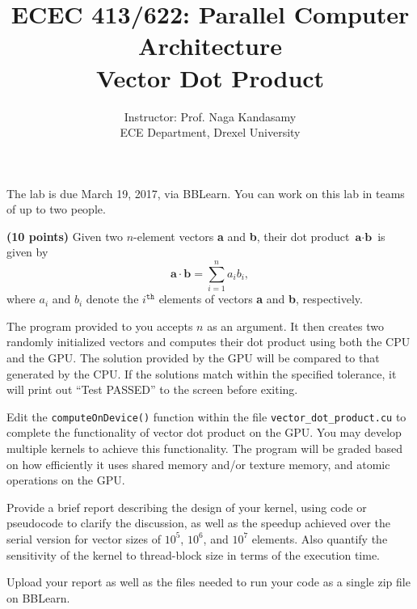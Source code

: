 \documentclass[12pt]{article}
\begin{document}
\title{ECEC 413/622: Parallel Computer Architecture \\
Vector Dot Product}
\author{Instructor: Prof. Naga Kandasamy \\ 
    ECE Department, Drexel University}
\maketitle %
\date{}

\noindent The lab is due March 19, 2017, via BBLearn. You can work on this lab in teams of up to two people.
\vspace{12pt}

\textbf{(10 points)} Given two $n$-element vectors \textbf{a} and \textbf{b}, their dot product $\textbf{a} \cdot \textbf{b}$ is given by
\begin{equation*}
\textbf{a} \cdot \textbf{b} = \sum_{i = 1}^{n}a_ib_i,
\end{equation*}
where $a_i$ and $b_i$ denote the $i^{\texttt{th}}$ elements of vectors \textbf{a} and \textbf{b}, respectively. 

The program provided to you accepts $n$ as an argument. It then creates two randomly initialized vectors and computes their dot product using both the CPU and the GPU. The solution provided by the GPU will be compared to that generated by the CPU. If the solutions match within the specified tolerance, it will print out ``Test PASSED'' to the screen before exiting.

Edit the \texttt{computeOnDevice()} function within the file \texttt{vector\_dot\_product.cu} to complete the functionality of vector dot product on the GPU. You may develop multiple kernels to achieve this functionality. The program will be graded based on how efficiently it uses shared memory and/or texture memory, and atomic operations on the GPU.

Provide a brief report describing the design of your kernel, using code or pseudocode to clarify the discussion, as well as the speedup achieved over the serial version for vector sizes of $10^5$, $10^6$, and $10^7$ elements. Also quantify the sensitivity of the kernel to thread-block size in terms of the execution time.

Upload your report as well as the files needed to run your code as a single zip file on BBLearn.
\end{document}
